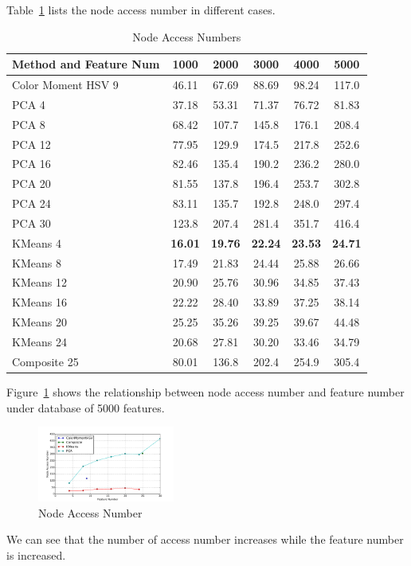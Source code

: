 \documentclass{acm_proc_article-sp}
\begin{document}
Table~\ref{table:accessnum} lists the node access number in different cases.
\begin{table} \centering 
\begin{tabular}{|p{2.1cm}|c|c|c|c|c|}
    \hline
    Method and Feature Num & 1000 & 2000 & 3000 & 4000 & 5000 \\ \hline
    Color Moment HSV 9 & 46.11 & 67.69 & 88.69 & 98.24 & 117.0 \\ \hline
    PCA 4 & 37.18 & 53.31 & 71.37 & 76.72 & 81.83 \\ \hline
    PCA 8 & 68.42 & 107.7 & 145.8 & 176.1 & 208.4 \\ \hline
    PCA 12 & 77.95 & 129.9 & 174.5 & 217.8 & 252.6 \\ \hline
    PCA 16 & 82.46 & 135.4 & 190.2 & 236.2 & 280.0 \\ \hline
    PCA 20 & 81.55 & 137.8 & 196.4 & 253.7 & 302.8 \\ \hline
    PCA 24 & 83.11 & 135.7 & 192.8 & 248.0 & 297.4 \\ \hline
    PCA 30 & 123.8 & 207.4 & 281.4 & 351.7 & 416.4 \\ \hline
    KMeans 4 & \textbf{16.01} & \textbf{19.76} & \textbf{22.24} &
    \textbf{23.53} & \textbf{24.71} \\ \hline
    KMeans 8 & 17.49 & 21.83 & 24.44 & 25.88 & 26.66 \\ \hline
    KMeans 12 & 20.90 & 25.76 & 30.96 & 34.85 & 37.43 \\ \hline
    KMeans 16 & 22.22 & 28.40 & 33.89 & 37.25 & 38.14 \\ \hline
    KMeans 20 & 25.25 & 35.26 & 39.25 & 39.67 & 44.48 \\ \hline
    KMeans 24 & 20.68 & 27.81 & 30.20 & 33.46 & 34.79 \\ \hline
    Composite 25 & 80.01 & 136.8 & 202.4 & 254.9 & 305.4 \\ \hline
\end{tabular}
    \caption{Node Access Numbers}
    \label{table:accessnum}
\end{table}

Figure~\ref{fig:accessnum} shows the relationship between node access number
    and feature number
    under database of 5000 features.
\begin{figure} \centering
    \includegraphics[width=0.4\textwidth]{data/accessnum.pdf}
    \caption{Node Access Number}
    \label{fig:accessnum}
\end{figure}
We can see that the number of access number increases while
    the feature number is increased.
\end{document}
